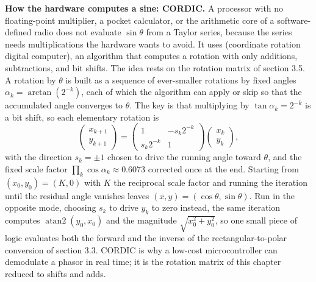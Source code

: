 \begin{mastery}
\textbf{How the hardware computes a sine: CORDIC.} A processor with no
floating-point multiplier, a pocket calculator, or the arithmetic core of a
software-defined radio does not evaluate $\sin\theta$ from a Taylor series,
because the series needs multiplications the hardware wants to avoid. It uses
 (coordinate rotation digital computer), an algorithm that
computes a rotation with only additions, subtractions, and bit shifts. The
idea rests on the rotation matrix of section 3.5. A rotation by $\theta$ is
built as a sequence of ever-smaller rotations by fixed angles
$\alpha_{k} = \arctan(2^{-k})$, each of which the algorithm can apply or skip
so that the accumulated angle converges to $\theta$. The key is that
multiplying by $\tan\alpha_{k} = 2^{-k}$ is a bit shift, so each elementary
rotation is
\[
\begin{pmatrix} x_{k+1} \\ y_{k+1} \end{pmatrix}
= \begin{pmatrix} 1 & -s_{k} 2^{-k} \\ s_{k} 2^{-k} & 1 \end{pmatrix}
\begin{pmatrix} x_{k} \\ y_{k} \end{pmatrix},
\]
with the direction $s_{k} = \pm 1$ chosen to drive the running angle toward
$\theta$, and the fixed scale factor $\prod_{k}\cos\alpha_{k} \approx 0.6073$
corrected once at the end. Starting from $(x_{0}, y_{0}) = (K, 0)$ with $K$
the reciprocal scale factor and running the iteration until the residual angle
vanishes leaves $(x, y) = (\cos\theta, \sin\theta)$. Run in the opposite mode,
choosing $s_{k}$ to drive $y_{k}$ to zero instead, the same iteration computes
$\operatorname{atan2}(y_{0}, x_{0})$ and the magnitude $\sqrt{x_{0}^{2} +
y_{0}^{2}}$, so one small piece of logic evaluates both the forward and the
inverse of the rectangular-to-polar conversion of section 3.3. CORDIC is why a
low-cost microcontroller can demodulate a phasor in real time; it is the
rotation matrix of this chapter reduced to shifts and adds.
\end{mastery}







